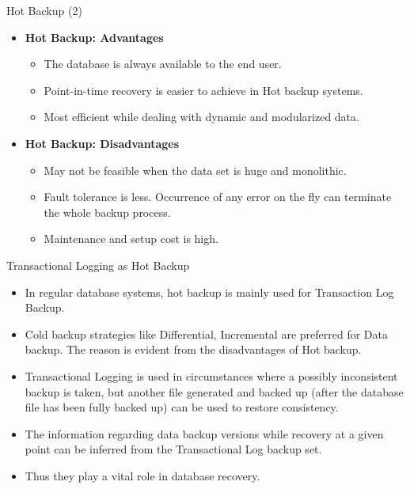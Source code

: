 \documentclass[aspectratio=169, xcolor=dvipsnames]{beamer}
\begin{document}
\begin{frame}{Hot Backup (2)}
    \begin{itemize}[<+->]
        \item \textbf{Hot Backup: Advantages}
        \begin{itemize}
            \item[$\triangleright$] The database is always available to the end user.
            \item[$\triangleright$] Point-in-time recovery is easier to achieve in Hot backup systems.
            \item[$\triangleright$] Most efficient while dealing with dynamic and modularized data.
        \end{itemize}
        \item \textbf{Hot Backup: Disadvantages}
        \begin{itemize}
            \item[$\triangleright$] May not be feasible when the data set is huge and monolithic.
            \item[$\triangleright$] Fault tolerance is less. Occurrence of any error on the fly can terminate the whole backup process.
            \item[$\triangleright$] Maintenance and setup cost is high.
        \end{itemize}
    \end{itemize}
\end{frame}

\begin{frame}{Transactional Logging as Hot Backup}
    \begin{itemize}[<+->]
        \item In regular database systems, hot backup is mainly used for Transaction Log Backup.
        \item Cold backup strategies like Differential, Incremental are preferred for Data backup. The reason is evident from the disadvantages of Hot backup.
        \item Transactional Logging is used in circumstances where a possibly inconsistent backup is taken, but another file generated and backed up (after the database file has been fully backed up) can be used to restore consistency.
        \item The information regarding data backup versions while recovery at a given point can be inferred from the Transactional Log backup set.
        \item Thus they play a vital role in database recovery.
    \end{itemize}
\end{frame}
\end{document}
